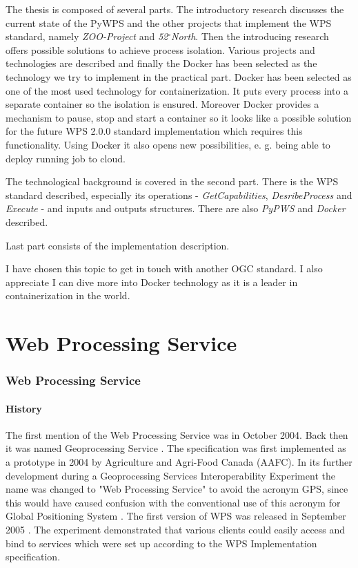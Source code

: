 \documentclass[12pt,a4paper]{article}
\begin{document}
The thesis is composed of several parts. The introductory research discusses the current state of the PyWPS and the
other projects that implement the WPS standard, namely \textit{ZOO-Project} and \textit{52$^{\circ}$North}. Then the
introducing research offers possible solutions to achieve process isolation. Various projects and technologies are
described and finally the Docker has been selected as the technology we try to implement in the practical part. Docker
has been selected as one of the most used technology for containerization. It puts every process into a separate
container so the isolation is ensured. Moreover Docker provides a mechanism to pause, stop and start a container so it
looks like a possible solution for the future WPS 2.0.0 standard implementation which requires this functionality. Using
Docker it also opens new possibilities, e. g. being able to deploy running job to cloud.

The technological background is covered in the second part. There is the WPS standard described, especially its operations
- \textit{GetCapabilities}, \textit{DesribeProcess} and \textit{Execute} - and inputs and outputs structures. There are also
\textit{PyPWS} and \textit{Docker} described.

Last part consists of the implementation description.

I have chosen this topic to get in touch with another OGC standard. I also appreciate I can dive more into Docker technology
as it is a leader in containerization in the world.

\newpage
\part{Web Processing Service}
\newpage
\section{Web Processing Service}

\subsection{History}
The first mention of the Web Processing Service was in October 2004. Back then it
was named Geoprocessing Service \cite{OGC_news}. The specification was first 
implemented as a prototype in 2004 by Agriculture and Agri-Food Canada (AAFC).
In its further development during a Geoprocessing Services Interoperability Experiment \cite{WPS_experiment} 
the name was changed to "Web Processing Service" to avoid the acronym GPS, since 
this would have caused confusion with the conventional use of this acronym for 
Global Positioning System \cite{WPS_standart_1.0}. The first version of WPS was released in
September 2005 \cite{WPS_first}. The experiment demonstrated that various clients
could easily access and bind to services which were set up according to the WPS Implementation
specification.
\end{document}
